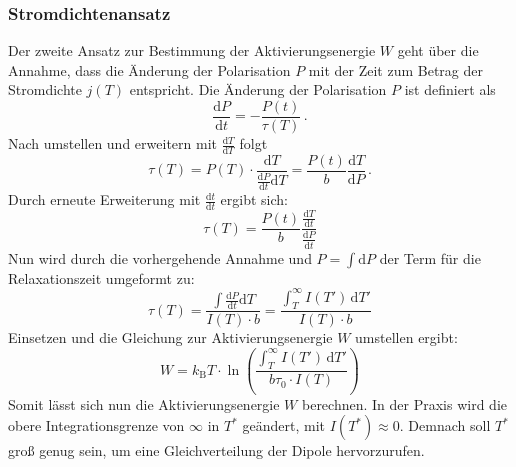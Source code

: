 \subsubsection{Stromdichtenansatz}
Der zweite Ansatz zur Bestimmung der Aktivierungsenergie $W$ geht über die Annahme,
dass die Änderung der Polarisation $P$ mit der Zeit zum Betrag der Stromdichte $j(T)$
entspricht.
Die Änderung der Polarisation $P$ ist definiert als
\begin{equation*}
    \frac{\text{d}P}{\text{d}t} = -\frac{P(t)}{\tau(T)}\, .
\end{equation*}
Nach umstellen und erweitern mit $\frac{\text{d}T}{\text{d}T}$ folgt 
\begin{equation*}
    \tau(T) = P(T) \cdot \frac{\text{d}T}{\frac{\text{d}P}{\text{d}t}\text{d}T } =  \frac{P(t)}{b} \frac{\text{d}T}{\text{d}P}\,.
\end{equation*}
Durch erneute Erweiterung mit $\frac{\text{d}t}{\text{d}t}$ ergibt sich:
\begin{equation*}
    \tau(T) = \frac{P(t)}{b} \frac{\frac{\text{d}T}{\text{d}t}}{\frac{\text{d}P}{\text{d}t}}
\end{equation*}
Nun wird durch die vorhergehende Annahme und $P =\int\text{d}P$ der Term für die Relaxationszeit umgeformt zu: 
\begin{equation*}
    \tau(T) = \frac{\int \frac{\text{d}P}{\text{d}t} \text{d}T}{I(T) \cdot b} = \frac{\int_T^\infty I(T') \, \text{d}T'}{I(T) \cdot b}
\end{equation*}
Einsetzen und die Gleichung zur Aktivierungsenergie $W$ umstellen ergibt:
\begin{equation}
    W = k_\text{B} T \cdot \ln\left( \frac{\int_T^\infty I(T') \, \text{d}T'}{b \tau_0 \cdot I(T)}\right)
    \label{eq:Int}
\end{equation}
Somit lässt sich nun die Aktivierungsenergie $W$ berechnen. In der Praxis wird die obere Integrationsgrenze von $\infty$ in $T^*$ geändert, mit
$I\left(T^*\right)\approx 0$. Demnach soll $T^*$ groß genug sein, um eine Gleichverteilung der Dipole hervorzurufen. 
